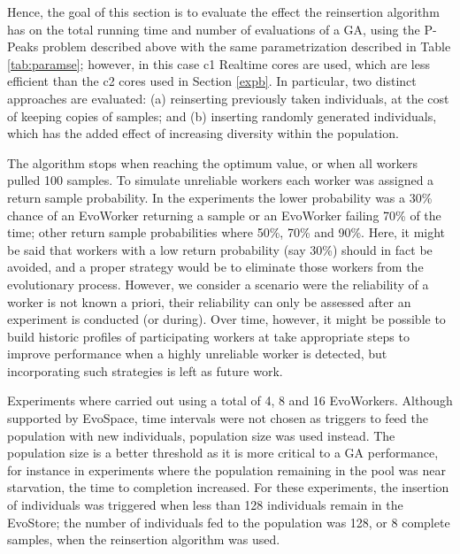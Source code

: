 Hence, the goal of this section is to evaluate the effect the reinsertion algorithm has on the total
running time and number of evaluations of a GA, using the P-Peaks problem described above with the same parametrization described in Table \ref{tab:paramse};
however, in this case c1 Realtime cores are used, which are less efficient than the c2 cores used in Section \ref{expb}.
In particular, two distinct approaches are evaluated: (a) reinserting previously taken individuals, at the cost of keeping copies of
samples; and (b) inserting randomly generated individuals, which has the added effect of increasing diversity within the population.

The algorithm stops when reaching the optimum value, or when all workers
pulled 100 samples. To simulate unreliable workers each worker was assigned a
return sample probability. In the experiments the lower probability was a 30\%
chance of an EvoWorker returning a sample or an EvoWorker failing 70\% of the
time; other return sample probabilities where 50\%, 70\% and 90\%.
Here, it might be said that workers with a low return probability (say 30\%) should in fact be avoided,
and a proper strategy would be to eliminate those workers from the evolutionary process.
However, we consider a scenario were the reliability of a worker is not known a priori, their reliability can only be assessed after an experiment is conducted (or during).
Over time, however, it might be possible to build historic profiles of participating workers at take appropriate steps to improve performance when a highly unreliable
worker is detected, but incorporating such strategies is left as future work.

Experiments where carried out using a total of 4, 8 and 16 EvoWorkers.
Although supported by EvoSpace, time intervals were not chosen as triggers
to feed the population with new individuals, population size was used instead.
The population size is a better threshold as it is more critical
to a GA performance, for instance in experiments where the population remaining in the pool was near starvation, the time to completion increased.
For these experiments, the insertion of individuals was triggered when less than
128 individuals remain in the EvoStore; the number of individuals fed to the
population was 128, or 8 complete samples, when the reinsertion algorithm was used.



